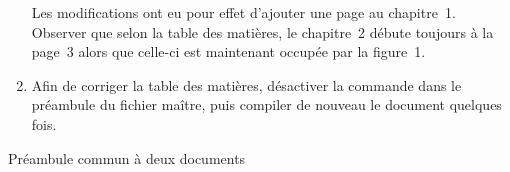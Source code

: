 \begin{exercice}
\begin{enumerate}
    Les modifications ont eu pour effet d'ajouter une page au
    chapitre~1. Observer que selon la table des matières, le
    chapitre~2 débute toujours à la page~3 alors que celle-ci est
    maintenant occupée par la figure~1.
  \item Afin de corriger la table des matières, désactiver la
    commande \verb== dans le préambule du fichier maître,
    puis compiler de nouveau le document quelques fois.
  \end{enumerate}
\end{exercice}

\begin{exercice}
  Préambule commun à deux documents
\end{exercice}

